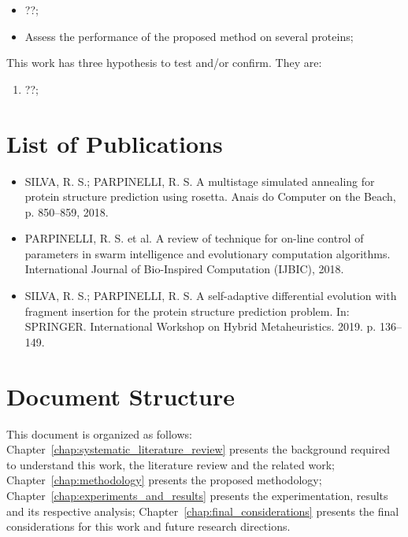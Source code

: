 \begin{itemize}
    \item ??;
    \item Assess the performance of the proposed method on several proteins;
\end{itemize}

This work has three hypothesis to test and/or confirm. They are:
\begin{enumerate}
    \item ??;
\end{enumerate}

\section{List of Publications}\label{sec:future_works}

\begin{itemize}
    \item SILVA, R. S.; PARPINELLI, R. S. A multistage simulated annealing for protein structure prediction using rosetta. Anais do Computer on the Beach, p. 850–859, 2018.
    \item PARPINELLI, R. S. et al. A review of technique for on-line control of parameters in swarm intelligence and evolutionary computation algorithms. International Journal of Bio-Inspired Computation (IJBIC), 2018.
    \item SILVA, R. S.; PARPINELLI, R. S. A self-adaptive differential evolution with fragment insertion  for  the  protein  structure  prediction  problem.  In:  SPRINGER. International Workshop on Hybrid Metaheuristics. 2019. p. 136–149.
\end{itemize}

\section{Document Structure} \label{sec:chap1_document_structure}

This document is organized as follows:
Chapter~\ref{chap:systematic_literature_review} presents the background
required to understand this work, the literature review and the related work;
Chapter~\ref{chap:methodology} presents the proposed methodology;
Chapter~\ref{chap:experiments_and_results} presents the experimentation,
results and its respective analysis;
Chapter~\ref{chap:final_considerations} presents the final considerations for
this work and future research directions.

